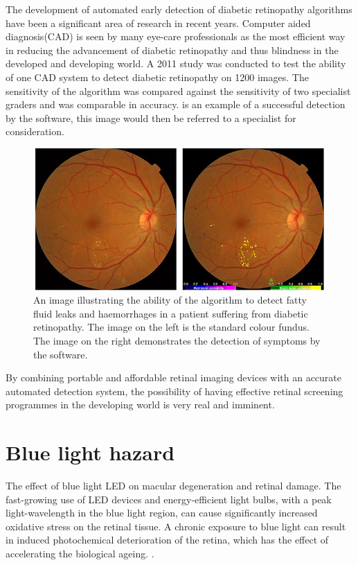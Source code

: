 The development of automated early detection of diabetic retinopathy algorithms have
been a significant area of research in recent years. Computer aided diagnosis(CAD)
is seen by many eye-care professionals as the most efficient way in reducing the
advancement of diabetic retinopathy and thus blindness in the developed and developing
world. A 2011 study was conducted to test the ability of one CAD system to detect
diabetic retinopathy on 1200 images. The sensitivity of the algorithm was compared
against the sensitivity of two specialist graders and was comparable in accuracy.
\cite{sanchez2011evaluation}  is an example of a successful detection
by the software, this image would then be referred to a specialist for consideration.

\begin{figure}[htbp]
\centering
 \includegraphics{figures/autodr}
\caption{An image illustrating the ability of the algorithm to detect fatty fluid leaks
and haemorrhages in a patient suffering from diabetic retinopathy. The image on the left
is the standard colour fundus. The image on the right demonstrates the detection of
symptoms by the software.}
\label{fig:autodr}
\end{figure}

By combining portable and affordable retinal imaging devices with an accurate automated
detection system, the possibility of having effective retinal screening programmes in the
developing world is very real and imminent. 


\section{Blue light hazard}

The effect of blue light LED on macular degeneration and retinal damage. The
fast-growing use of LED devices and energy-efficient light bulbs, with a peak light-wavelength
in the blue light region, can cause significantly increased oxidative stress on the retinal
tissue.\cite{shang_wang} A chronic exposure to blue light can result in induced photochemical
deterioration of the retina, which has the effect of accelerating the biological ageing.
\cite{behar_cohen_2011}.

